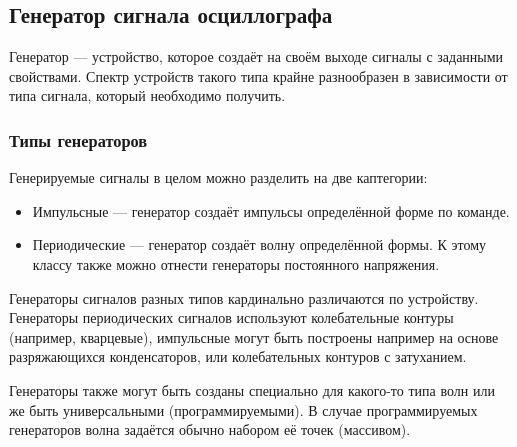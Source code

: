 \documentclass[a4paper,12pt]{report}
\numberwithin{equation}{section}
\begin{document}
\subsection{Генератор сигнала осциллографа}
Генератор --- устройство, которое создаёт на своём выходе сигналы с заданными
свойствами. Спектр устройств такого типа крайне разнообразен в зависимости от
типа сигнала, который необходимо получить.~\cite{radiomaster:gen}

\subsubsection{Типы генераторов}
Генерируемые сигналы в целом можно разделить на две каптегории:
\begin{itemize}
\item Импульсные --- генератор создаёт импульсы определённой форме по команде.
\item Периодические --- генератор создаёт волну определённой формы. К этому
  классу также можно отнести генераторы постоянного напряжения.
\end{itemize}
Генераторы сигналов разных типов кардинально различаются по
устройству. Генераторы периодических сигналов используют колебательные контуры
(например, кварцевые), импульсные могут быть построены например на основе
разряжающихся конденсаторов, или колебательных контуров с затуханием.

Генераторы также могут быть созданы специально для какого-то типа волн или же
быть универсальными (программируемыми). В случае программируемых генераторов
волна задаётся обычно набором её точек (массивом).
\end{document}
